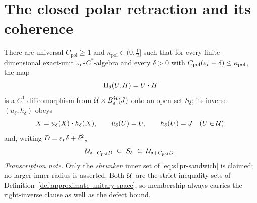 \section{The closed polar retraction and its coherence}\label{sec:stage1-polar-retraction}

\begin{lemma}\label{lem:stage1-polar-retraction}
There are universal $C_{\mathrm{pol}}\ge1$ and $\kappa_{\mathrm{pol}}\in(0,\tfrac12]$ such
that for every finite-dimensional exact-unit $\varepsilon_r$-$C^*$-algebra and every $\delta>0$
with $C_{\mathrm{pol}}(\varepsilon_r+\delta)\le\kappa_{\mathrm{pol}}$, the map
\begin{equation}\label{eq:s1pr-pi}
  \Pi_\delta(U,H)=U\mathbin{\bm{\cdot}} H
\end{equation}
is a $C^{1}$ diffeomorphism from $\mathcal U\times B^{\mathcal H}_{\delta}(J)$ onto an open set
$S_\delta$; its inverse $(u_\delta,h_\delta)$ obeys
\begin{equation}\label{eq:s1pr-inverse}
  X=u_\delta(X)\mathbin{\bm{\cdot}} h_\delta(X),\qquad u_\delta(U)=U,\qquad h_\delta(U)=J\quad(U\in\mathcal U);
\end{equation}
and, writing $D=\varepsilon_r\delta+\delta^{2}$,
\begin{equation}\label{eq:s1pr-sandwich}
  \mathcal U_{\delta-C_{\mathrm{pol}}D}\;\subseteq\;S_\delta\;\subseteq\;\mathcal U_{\delta+C_{\mathrm{pol}}D}.
\end{equation}
\emph{Transcription note.} Only the \emph{shrunken} inner set of \eqref{eq:s1pr-sandwich} is
claimed; no larger inner radius is asserted. Both $\mathcal U_{\cdot}$ are the strict-inequality
sets of Definition~\ref{def:approximate-unitary-space}, so membership always carries the
right-inverse clause as well as the defect bound.
\end{lemma}

